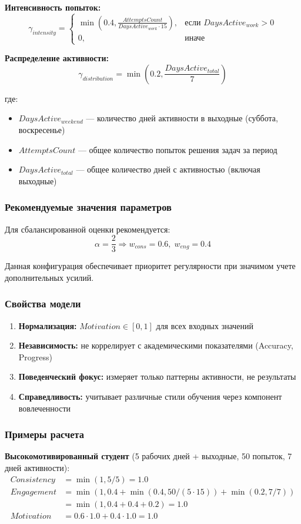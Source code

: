 \documentclass[12pt,a4paper]{article}
\begin{document}
\textbf{Интенсивность попыток:}
\[
\gamma_{intensity} = \begin{cases}
\min\left(0.4, \frac{AttemptsCount}{DaysActive_{work} \cdot 15}\right), & \text{если } DaysActive_{work} > 0 \\
0, & \text{иначе}
\end{cases}
\]

\textbf{Распределение активности:}
\[
\gamma_{distribution} = \min\left(0.2, \frac{DaysActive_{total}}{7}\right)
\]

где:
\begin{itemize}
\item $DaysActive_{weekend}$ — количество дней активности в выходные (суббота, воскресенье)
\item $AttemptsCount$ — общее количество попыток решения задач за период
\item $DaysActive_{total}$ — общее количество дней с активностью (включая выходные)
\end{itemize}

\subsubsection{Рекомендуемые значения параметров}
Для сбалансированной оценки рекомендуется:
\[
\alpha = \frac{2}{3} \Rightarrow w_{cons} = 0.6, \; w_{eng} = 0.4
\]

Данная конфигурация обеспечивает приоритет регулярности при значимом учете дополнительных усилий.

\subsubsection{Свойства модели}
\begin{enumerate}
\item \textbf{Нормализация:} $Motivation \in [0, 1]$ для всех входных значений
\item \textbf{Независимость:} не коррелирует с академическими показателями (Accuracy, Progress)
\item \textbf{Поведенческий фокус:} измеряет только паттерны активности, не результаты
\item \textbf{Справедливость:} учитывает различные стили обучения через компонент вовлеченности
\end{enumerate}

\subsubsection{Примеры расчета}
\textbf{Высокомотивированный студент} (5 рабочих дней + выходные, 50 попыток, 7 дней активности):
\[
\begin{aligned}
Consistency &= \min(1, 5/5) = 1.0 \\
Engagement &= \min(1, 0.4 + \min(0.4, 50/(5 \cdot 15)) + \min(0.2, 7/7)) \\
&= \min(1, 0.4 + 0.4 + 0.2) = 1.0 \\
Motivation &= 0.6 \cdot 1.0 + 0.4 \cdot 1.0 = 1.0
\end{aligned}
\]
\end{document}
